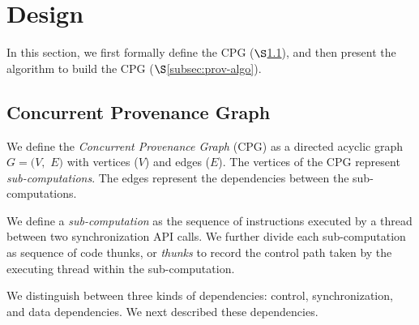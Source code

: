 \section{Design}
\label{sec:algorithms}
In this section, we first formally define the CPG ($\S$\ref{subsec:cpg}), and then present the algorithm to build the CPG ($\S$\ref{subsec:prov-algo}).

\subsection{Concurrent Provenance Graph} 
\label{subsec:cpg}

 We define the {\em
Concurrent Provenance Graph} (CPG)  as a directed acyclic graph $G =
(V,$ $E)$ with vertices ($V$) and edges ($E$). The
vertices of the CPG represent {\em sub-computations}. The edges represent the dependencies between the sub-computations. %

 We define a {\em sub-computation}  as the sequence of instructions
executed by a thread between two \pthreads synchronization API calls. %
We further divide each sub-computation as sequence of code thunks, or {\em thunks} to record the control path taken by the executing thread within the sub-computation.


 We distinguish between three kinds of dependencies: control, synchronization, and data dependencies. We next described these dependencies.



